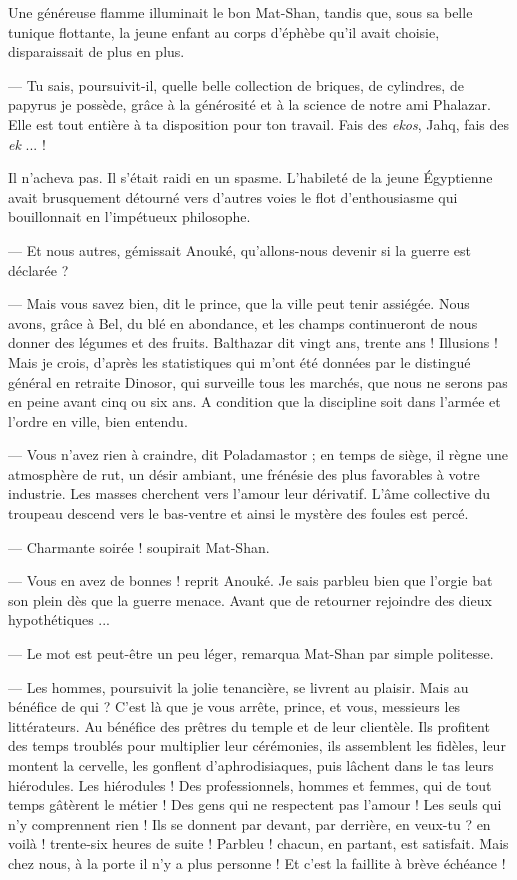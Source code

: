 \documentclass[a4paper, 11pt, oneside, polutonikogreek, french]{article}
\begin{document}
Une généreuse flamme illuminait le bon Mat-Shan, tandis que, sous sa belle tunique flottante, la jeune enfant au corps d'éphèbe qu'il avait choisie, disparaissait de plus en plus.

--- Tu sais, poursuivit-il, quelle belle collection de briques, de cylindres, de papyrus je possède, grâce à la générosité et à la science de notre ami Phalazar. Elle est tout entière à ta disposition pour ton travail. Fais des \emph{ekos}, Jahq, fais des \emph{ek} ... !

Il n'acheva pas. Il s'était raidi en un spasme. L'habileté de la jeune Égyptienne avait brusquement détourné vers d'autres voies le flot d'enthousiasme qui bouillonnait en l'impétueux philosophe.

--- Et nous autres, gémissait Anouké, qu'allons-nous devenir si la guerre est déclarée ?

--- Mais vous savez bien, dit le prince, que la ville peut tenir assiégée. Nous avons, grâce à Bel, du blé en abondance, et les champs continueront de nous donner des légumes et des fruits. Balthazar dit vingt ans, trente ans ! Illusions ! Mais je crois, d'après les statistiques qui m'ont été données par le distingué général en retraite Dinosor, qui surveille tous les marchés, que nous ne serons pas en peine avant cinq ou six ans. A condition que la discipline soit dans l'armée et l'ordre en ville, bien entendu.

--- Vous n'avez rien à craindre, dit Poladamastor ; en temps de siège, il règne une atmosphère de rut, un désir ambiant, une frénésie des plus favorables à votre industrie. Les masses cherchent vers l'amour leur dérivatif. L'âme collective du troupeau descend vers le bas-ventre et ainsi le mystère des foules est percé.

--- Charmante soirée ! soupirait Mat-Shan.

--- Vous en avez de bonnes ! reprit Anouké. Je sais parbleu bien que l'orgie bat son plein dès que la guerre menace. Avant que de retourner rejoindre des dieux hypothétiques ...

--- Le mot est peut-être un peu léger, remarqua Mat-Shan par simple politesse.

--- Les hommes, poursuivit la jolie tenancière, se livrent au plaisir. Mais au bénéfice de qui ? C'est là que je vous arrête, prince, et vous, messieurs les littérateurs. Au bénéfice des prêtres du temple et de leur clientèle. Ils profitent des temps troublés pour multiplier leur cérémonies, ils assemblent les fidèles, leur montent la cervelle, les gonflent d'aphrodisiaques, puis lâchent dans le tas leurs hiérodules. Les hiérodules ! Des professionnels, hommes et femmes, qui de tout temps gâtèrent le métier ! Des gens qui ne respectent pas l'amour ! Les seuls qui n'y comprennent rien ! Ils se donnent par devant, par derrière, en veux-tu ? en voilà ! trente-six heures de suite ! Parbleu ! chacun, en partant, est satisfait. Mais chez nous, à la porte il n'y a plus personne ! Et c'est la faillite à brève échéance !
\end{document}

